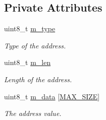 \subsection*{Private Attributes}
\begin{DoxyCompactItemize}
\item 
uint8\+\_\+t \hyperlink{classns3_1_1Address_a87c645799a51ab3e837e109311f6df1b}{m\+\_\+type}
\begin{DoxyCompactList}\small\item\em Type of the address. \end{DoxyCompactList}\item 
uint8\+\_\+t \hyperlink{classns3_1_1Address_a32902f96babca046e1917f014ec068ea}{m\+\_\+len}
\begin{DoxyCompactList}\small\item\em Length of the address. \end{DoxyCompactList}\item 
uint8\+\_\+t \hyperlink{classns3_1_1Address_a41d4da5b9c5dc78d0d91915d1cf6828c}{m\+\_\+data} \mbox{[}\hyperlink{classns3_1_1Address_a34cb50781c65195ba10651d82d084b4fae450cf1a7cb3df8a05d29b23aecf7f84}{M\+A\+X\+\_\+\+S\+I\+ZE}\mbox{]}
\begin{DoxyCompactList}\small\item\em The address value. \end{DoxyCompactList}\end{DoxyCompactItemize}
